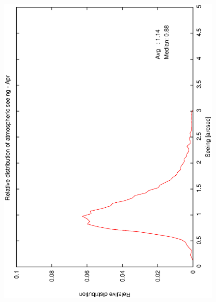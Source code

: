 {{\begin{figure}[htbp]
\begin{center}
{   \includegraphics[scale=0.25, angle=-90]{figures/ecs/corr_see_dist_apr.eps} 
   \label{fig:see_dist_apr}
  }
 \subfigure[] {
}
\end{center}
\end{figure}}}
